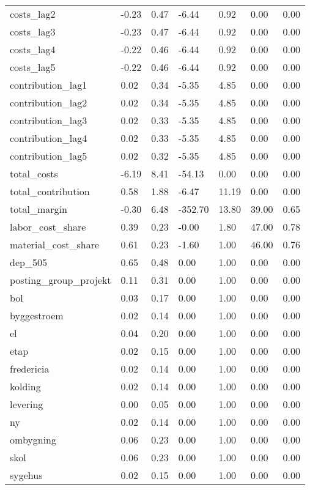 \begin{landscape}
\begin{longtable}[h!]{lllllll}
costs_lag2 & -0.23 & 0.47 & -6.44 & 0.92 & 0.00 & 0.00 \\
costs_lag3 & -0.23 & 0.47 & -6.44 & 0.92 & 0.00 & 0.00 \\
costs_lag4 & -0.22 & 0.46 & -6.44 & 0.92 & 0.00 & 0.00 \\
costs_lag5 & -0.22 & 0.46 & -6.44 & 0.92 & 0.00 & 0.00 \\
contribution_lag1 & 0.02 & 0.34 & -5.35 & 4.85 & 0.00 & 0.00 \\
contribution_lag2 & 0.02 & 0.34 & -5.35 & 4.85 & 0.00 & 0.00 \\
contribution_lag3 & 0.02 & 0.33 & -5.35 & 4.85 & 0.00 & 0.00 \\
contribution_lag4 & 0.02 & 0.33 & -5.35 & 4.85 & 0.00 & 0.00 \\
contribution_lag5 & 0.02 & 0.32 & -5.35 & 4.85 & 0.00 & 0.00 \\
total_costs & -6.19 & 8.41 & -54.13 & 0.00 & 0.00 & 0.00 \\
total_contribution & 0.58 & 1.88 & -6.47 & 11.19 & 0.00 & 0.00 \\
total_margin & -0.30 & 6.48 & -352.70 & 13.80 & 39.00 & 0.65 \\
labor_cost_share & 0.39 & 0.23 & -0.00 & 1.80 & 47.00 & 0.78 \\
material_cost_share & 0.61 & 0.23 & -1.60 & 1.00 & 46.00 & 0.76 \\
dep_505 & 0.65 & 0.48 & 0.00 & 1.00 & 0.00 & 0.00 \\
posting_group_projekt & 0.11 & 0.31 & 0.00 & 1.00 & 0.00 & 0.00 \\
bol & 0.03 & 0.17 & 0.00 & 1.00 & 0.00 & 0.00 \\
byggestroem & 0.02 & 0.14 & 0.00 & 1.00 & 0.00 & 0.00 \\
el & 0.04 & 0.20 & 0.00 & 1.00 & 0.00 & 0.00 \\
etap & 0.02 & 0.15 & 0.00 & 1.00 & 0.00 & 0.00 \\
fredericia & 0.02 & 0.14 & 0.00 & 1.00 & 0.00 & 0.00 \\
kolding & 0.02 & 0.14 & 0.00 & 1.00 & 0.00 & 0.00 \\
levering & 0.00 & 0.05 & 0.00 & 1.00 & 0.00 & 0.00 \\
ny & 0.02 & 0.14 & 0.00 & 1.00 & 0.00 & 0.00 \\
ombygning & 0.06 & 0.23 & 0.00 & 1.00 & 0.00 & 0.00 \\
skol & 0.06 & 0.23 & 0.00 & 1.00 & 0.00 & 0.00 \\
sygehus & 0.02 & 0.15 & 0.00 & 1.00 & 0.00 & 0.00 \\

\end{longtable}
\end{landscape}
